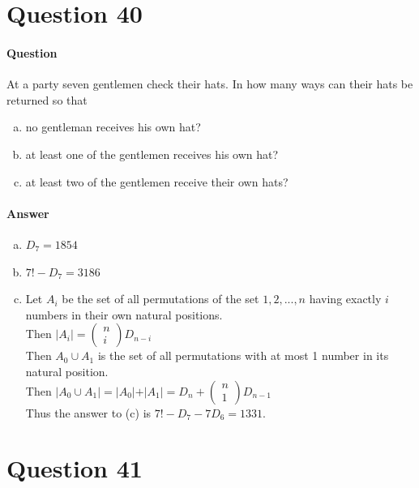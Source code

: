 \documentclass[UTF8]{article}
\begin{document}
    \section{Question 40}
    \paragraph{Question}
    At a party seven gentlemen check their hats. In how many ways can their hats be returned so that
    \begin{enumerate}[(a)]
    \item no gentleman receives his own hat?
    \item at least one of the gentlemen receives his own hat?
    \item at least two of the gentlemen receive their own hats?
    \end{enumerate}
    \paragraph{Answer}
    \begin{center}
        \begin{enumerate}[(a)]
            \item $D_{7} = 1854$
            \item $7! - D_{7} = 3186$
            \item Let $A_{i}$ be the set of all permutations of the set ${1, 2, . . . , n}$ having exactly $i$ numbers in their own natural positions. \\
                  Then $ \vert A_{i} \vert = \begin{pmatrix} n \\ i \end{pmatrix}D_{n - i}$ \\
                  Then $ A_{0} \cup A_{1} $ is the set of all permutations with at most 1 number in its natural position. \\
                  Then $ \vert A_{0} \cup A_{1} \vert = \vert A_{0} \vert + \vert A_{1} \vert = D_{n} + \begin{pmatrix} n \\ 1 \end{pmatrix}D_{n - 1}$ \\
                  Thus the answer to (c) is $ 7! - D_{7} - 7D_{6} = 1331 $.
        \end{enumerate}
    \end{center}

    \section{Question 41}
\end{document}
